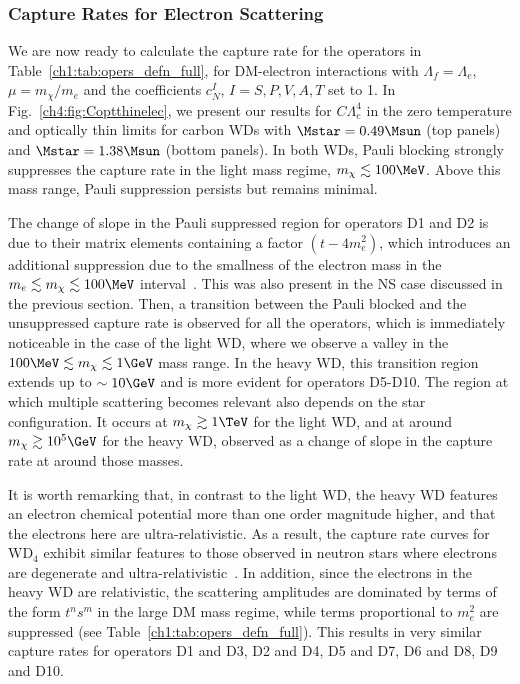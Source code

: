 \subsubsection{Capture Rates for Electron Scattering}
\label{ch4:subsubsec:resutls_capture_WD}

We are now ready to calculate the capture rate for the operators in Table~\ref{ch1:tab:opers_defn_full}, for DM-electron interactions with $\Lambda_f=\Lambda_e$, $\mu=m_\chi/m_e$ and the coefficients $c_N^I$, $I=S, P,V,A,T$ set to 1.
In Fig.~\ref{ch4:fig:Coptthinelec}, we present our results for $C\Lambda_e^4$ in the zero temperature and optically thin limits for carbon WDs with $\Mstar=0.49\Msun$ (top panels) and  $\Mstar=1.38\Msun$ (bottom panels). In both WDs, Pauli blocking strongly suppresses the capture rate in the light mass regime,  $m_\chi\lesssim 100\MeV$. Above this mass range, Pauli suppression persists but remains minimal.  

The change of slope in the Pauli suppressed region for operators D1 and D2 is due to their matrix elements containing a factor $(t-4m_e^2)$, which introduces an additional suppression due to the smallness of the electron mass in the $m_e\lesssim m_\chi\lesssim100\MeV$ interval~\cite{Bell:2020lmm_mar_ImprovedTreatmentDark}. This was also present in the NS case discussed in the previous section. 
Then, a transition between the Pauli blocked and the unsuppressed capture rate is observed for all the operators, which is immediately noticeable in the case of the light WD, where we observe a valley  in the  $100\MeV\lesssim m_\chi\lesssim1\GeV$ mass range. In the heavy WD, this transition region extends up to $\sim10\GeV$ and is more evident for operators D5-D10. 
The region at which multiple scattering becomes relevant also depends on the star configuration.  It occurs at $m_\chi\gtrsim1\TeV$ for the light WD, and at around  $m_\chi\gtrsim10^5\GeV$ for the heavy WD, observed as a change of slope in the capture rate at around those masses. 

It is worth remarking that, in contrast to the light WD, the heavy WD features an electron chemical potential more than one order magnitude higher, and that the electrons here are ultra-relativistic. As a result, the capture rate curves for WD$_4$ exhibit similar features to those observed in neutron stars where electrons are degenerate and ultra-relativistic~\cite{Bell:2020lmm_mar_ImprovedTreatmentDark}. In addition, since the electrons in the heavy WD are relativistic, the scattering amplitudes are dominated by terms of the form $t^ns^m$  in the large DM mass regime, while terms proportional to $m_e^2$ are suppressed (see Table~\ref{ch1:tab:opers_defn_full}). This results in very similar capture rates for operators D1 and D3, D2 and D4, D5 and D7, D6 and D8, D9 and D10.  

